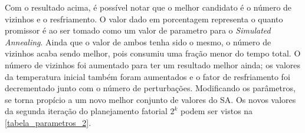 \documentclass[
	12pt,				%
	twoside,			%
	a4paper,			%
	english,			%
	french,				%
	spanish,			%
	brazil				%
	]{abntex2}
\begin{document}
Com o resultado acima, é possível notar que o melhor candidato é o
número de vizinhos e o resfriamento. O valor dado em porcentagem
representa o quanto promissor é ao ser tomado como um valor de parametro
para o \emph{Simulated Annealing}. Ainda que o valor de ambos tenha sido
o mesmo, o número de vizinhos acaba sendo melhor, pois consumiu uma
fração menor do tempo total. O número de vizinhos foi aumentado para ter
um resultado melhor ainda; os valores da temperatura inicial também
foram aumentados e o fator de resfriamento foi decrementado junto com o
número de perturbações. Modificando os parâmetros, se torna propício a
um novo melhor conjunto de valores do SA. Os novos valores da segunda
iteração do planejamento fatorial \(2^{k}\) podem ser vistos na
\autoref{tabela_parametros_2}.

\begin{table}[ht]
    \centering
    \caption{Fatores para parâmetro para o \textit{Simulated Annealing} na segunda iteração}
    \label{tabela_parametros_2}
\end{table}
\end{document}
